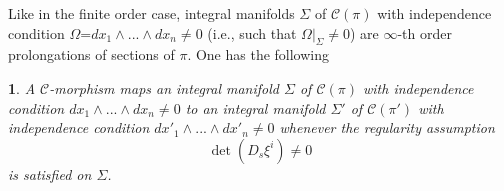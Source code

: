 \documentclass[12pt,english]{elsarticle}
\theoremstyle{plain}
\theoremstyle{plain}
\newtheorem{prop}[thm]{\protect\propositionname}
\theoremstyle{remark}
\theoremstyle{plain}
\theoremstyle{definition}
\theoremstyle{definition}
\providecommand{\propositionname}{Proposition}
\begin{document}
Like in the finite order case, integral manifolds $\Sigma $ of
$\mathcal{C}(\pi )$ with independence condition
$\text{$\Omega$=}dx_{1}\wedge ...\wedge dx_{n}\neq 0$ (i.e.,
such that $\Omega |_{\Sigma}\neq 0$) are $\infty $-th order prolongations
of sections of $\pi $. One has the following
%
\begin{prop}
\label{morp_sends_prol}%
A $\mathcal{C}$-morphism maps an integral manifold $\Sigma $ of
$\mathcal{C}(\pi )$ with independence condition
$dx_{1}\wedge ...\wedge dx_{n}\neq 0$ to an integral manifold
$\Sigma '$ of $\mathcal{C}(\pi ')$ with independence condition
$dx'_{1}\wedge ...\wedge dx'_{n}\neq 0$ whenever the regularity assumption
%
\begin{equation}
\det \left (D_{s}\xi ^{i}\right )\neq 0
\label{eq:xi_nondeg}
\end{equation}
%
is satisfied on $\Sigma $. \end{prop}
\end{document}
